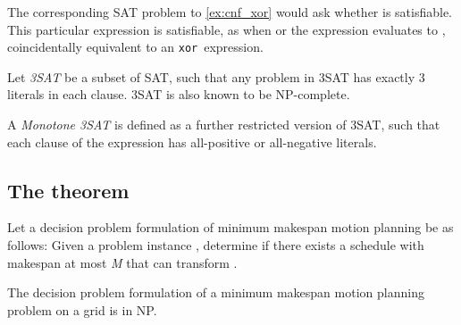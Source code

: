 The corresponding SAT problem to \cref{ex:cnf_xor} would ask whether \ilmath{\varphi} is satisfiable. This particular expression is satisfiable, as when  or  the expression evaluates to \true, coincidentally equivalent to an \texttt{xor}\ expression.

\begin{definition}
	Let \emph{3SAT} be a subset of SAT, such that any problem in 3SAT has exactly 3 literals in each clause. 3SAT is also known to be NP-complete.
\end{definition}

\begin{definition}
	A \emph{Monotone 3SAT} is defined as a further restricted version of 3SAT, such that  each clause of the expression has all-positive or all-negative literals. 
\end{definition}










\subsection{The theorem}

Let a decision problem formulation of minimum makespan motion planning be as follows: Given a problem instance , determine if there exists a schedule with makespan at most \emph{M} that can transform .

\begin{lemma}\label{lemma:np}
	The decision problem formulation of a minimum makespan motion planning problem on a grid is in NP.
\end{lemma}

